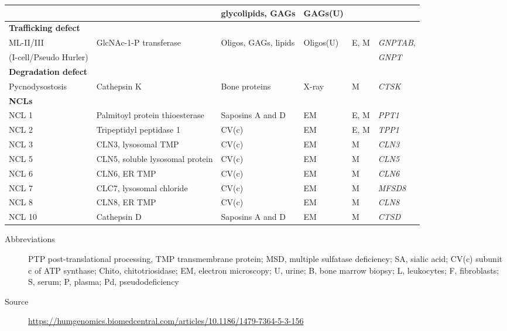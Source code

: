\documentclass[landscape]{article}
\begin{document}
\begin{longtable}{llllll}
 &  & glycolipids, GAGs & GAGs(U) &  & \\
\hline
\textbf{Trafficking defect} &  &  &  &  & \\
ML-II/III & GlcNAc-1-P transferase & Oligos, GAGs, lipids & Oligos(U) & E\footnotemark, M & \emph{GNPTAB},\\
(I-cell/Pseudo Hurler) &  &  &  &  & \emph{GNPT}\\
\hline
\textbf{Degradation defect} &  &  &  &  & \\
Pycnodysostosis & Cathepsin K & Bone proteins & X-ray & M & \emph{CTSK}\\
\hline
\textbf{NCLs} &  &  &  &  & \\
NCL 1 & Palmitoyl protein thioesterase & Saposins A and D & EM & E, M & \emph{PPT1}\\
NCL 2 & Tripeptidyl peptidase 1 & CV(c) & EM & E, M & \emph{TPP1}\\
NCL 3 & CLN3, lysosomal TMP & CV(c) & EM & M & \emph{CLN3}\\
NCL 5 & CLN5, soluble lysosomal protein & CV(c) & EM & M & \emph{CLN5}\\
NCL 6 & CLN6, ER TMP & CV(c) & EM & M & \emph{CLN6}\\
NCL 7 & CLC7, lysosomal chloride & CV(c) & EM & M & \emph{MFSD8}\\
NCL 8 & CLN8, ER TMP & CV(c) & EM & M & \emph{CLN8}\\
NCL 10 & Cathepsin D & Saposins A and D & EM & M & \emph{CTSD}\\
\end{longtable}

\begin{description}
\item[{Abbreviations}] PTP post-translational processing, TMP
transmembrane protein; MSD, multiple sulfatase deficiency; SA, sialic acid; CV(c) subunit c of ATP
synthase; Chito, chitotriosidase; EM, electron microscopy; U, urine;
B, bone marrow biopsy; L, leukocytes; F, fibroblasts; S, serum; P,
plasma; Pd, pseudodeficiency
\item[{Source}] \url{https://humgenomics.biomedcentral.com/articles/10.1186/1479-7364-5-3-156}
\end{description}
\end{document}
